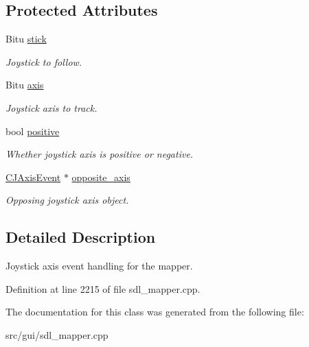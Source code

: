 \subsection*{Protected Attributes}
\begin{DoxyCompactItemize}
\item 
\hypertarget{classCJAxisEvent_a4445db17f0538358d815ab53d449beba}{Bitu \hyperlink{classCJAxisEvent_a4445db17f0538358d815ab53d449beba}{stick}}\label{classCJAxisEvent_a4445db17f0538358d815ab53d449beba}

\begin{DoxyCompactList}\small\item\em Joystick to follow. \end{DoxyCompactList}\item 
\hypertarget{classCJAxisEvent_aef7080ddb8c0a07235865f4f8f33bf90}{Bitu \hyperlink{classCJAxisEvent_aef7080ddb8c0a07235865f4f8f33bf90}{axis}}\label{classCJAxisEvent_aef7080ddb8c0a07235865f4f8f33bf90}

\begin{DoxyCompactList}\small\item\em Joystick axis to track. \end{DoxyCompactList}\item 
\hypertarget{classCJAxisEvent_a90367a0731415ea7dd7b3d01fa153367}{bool \hyperlink{classCJAxisEvent_a90367a0731415ea7dd7b3d01fa153367}{positive}}\label{classCJAxisEvent_a90367a0731415ea7dd7b3d01fa153367}

\begin{DoxyCompactList}\small\item\em Whether joystick axis is positive or negative. \end{DoxyCompactList}\item 
\hypertarget{classCJAxisEvent_aef506ec736efabf7a118af104921a998}{\hyperlink{classCJAxisEvent}{C\-J\-Axis\-Event} $\ast$ \hyperlink{classCJAxisEvent_aef506ec736efabf7a118af104921a998}{opposite\-\_\-axis}}\label{classCJAxisEvent_aef506ec736efabf7a118af104921a998}

\begin{DoxyCompactList}\small\item\em Opposing joystick axis object. \end{DoxyCompactList}\end{DoxyCompactItemize}


\subsection{Detailed Description}
Joystick axis event handling for the mapper. 

Definition at line 2215 of file sdl\-\_\-mapper.\-cpp.



The documentation for this class was generated from the following file\-:\begin{DoxyCompactItemize}
\item 
src/gui/sdl\-\_\-mapper.\-cpp\end{DoxyCompactItemize}
